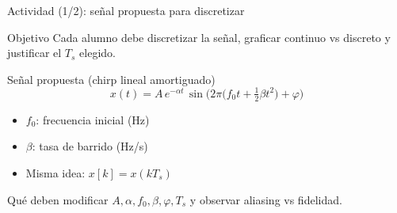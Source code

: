 \documentclass[aspectratio=169,10pt]{beamer}
\newcommand{\importantbox}[2][Importante]{%
\begin{alertblock}{#1}#2\end{alertblock}}
\newcommand{\objectivebox}[1]{%
\begin{block}{Objetivo}#1\end{block}}
\begin{document}
\begin{frame}{Actividad (1/2): señal propuesta para discretizar}
\small

\objectivebox{
Cada alumno debe discretizar la señal, graficar continuo vs discreto y justificar el $T_s$ elegido.
}

\begin{block}{Señal propuesta (chirp lineal amortiguado)}
\[
x(t)=A\,e^{-\alpha t}\,\sin\!\Big(2\pi\big(f_0 t + \tfrac{1}{2}\beta t^2\big)+\varphi\Big)
\]
\end{block}

\begin{itemize}
\item $f_0$: frecuencia inicial (Hz)
\item $\beta$: tasa de barrido (Hz/s)
\item Misma idea: $x[k]=x(kT_s)$
\end{itemize}

\importantbox[Qué deben modificar]{
$A,\alpha,f_0,\beta,\varphi,T_s$ y observar aliasing vs fidelidad.
}
\end{frame}
\end{document}
